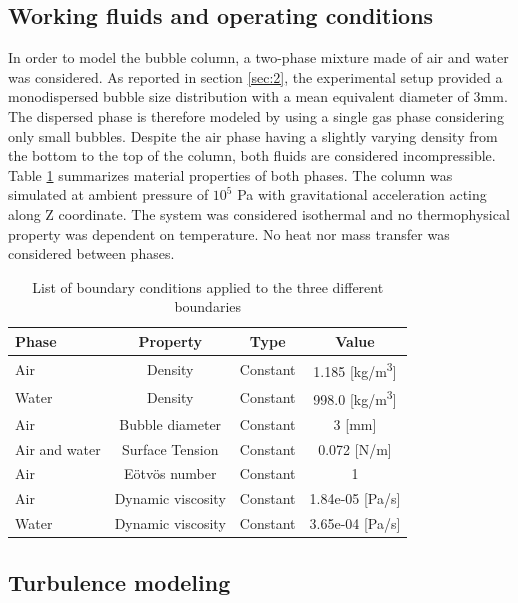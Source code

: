 \documentclass[11pt,a4paper]{article}
\begin{document}
\subsection{Working fluids and operating conditions}
\label{sub:fluids}
In order to model the bubble column, a two-phase mixture made of air and water was considered. As reported in section \ref{sec:2}, the experimental setup provided a monodispersed bubble size distribution with a mean equivalent diameter of 3mm. The dispersed phase is therefore modeled by using a single gas phase considering only small bubbles. Despite the air phase having a slightly varying density from the bottom to the top of the column, both fluids are considered incompressible. Table \ref{tab:materials} summarizes material properties of both phases. The column was simulated at ambient pressure of $10^5$ Pa with gravitational acceleration acting along Z coordinate. The system was considered isothermal and no thermophysical property was dependent on temperature. No heat nor mass transfer was considered between phases.

\begin{table}[H]
  \centering
    \begin{tabular}{|p{7em} c c c|}
    \hline
    \rowcolor{bluePoli!40}
    \textbf{Phase} & \textbf{Property} & \textbf{Type} & \textbf{Value} \T\B \\
     \hline \hline
    Air & Density & Constant & 1.185 [kg/m\textsuperscript{3}] \T\B \\
    Water & Density & Constant & 998.0 [kg/m\textsuperscript{3}] \T\B \\
    Air & Bubble diameter & Constant & 3 [mm] \T\B \\  
    Air and water & Surface Tension & Constant & 0.072 [N/m] \T\B \\   
    Air & E{ö}tv{ö}s number & Constant & 1    \T\B \\ 
    Air & Dynamic viscosity & Constant & 1.84e-05 [Pa/s]    \T\B \\ 
    Water & Dynamic viscosity & Constant & 3.65e-04 [Pa/s]    \T\B \\ 
    \hline
    \end{tabular}%
  \caption{List of boundary conditions applied to the three different boundaries}
  \label{tab:materials}%
\end{table}%



\subsection{Turbulence modeling}
\label{sub:turbmodels}
\end{document}
